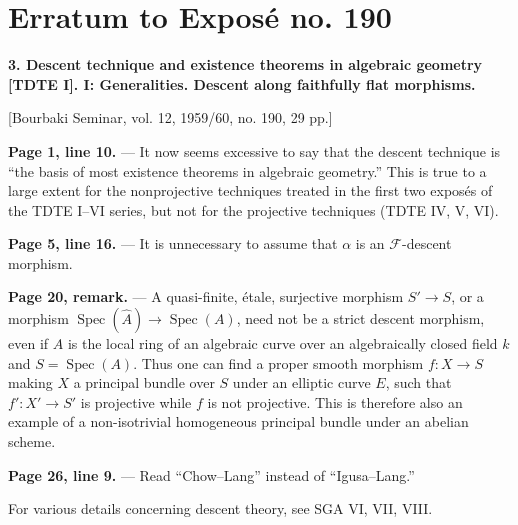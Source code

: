 \clearpage
\chapter*{Erratum to Exposé no. 190}
\setcounter{footnote}{0}

\noindent\textbf{3. Descent technique and existence theorems in algebraic
geometry [TDTE I]. I: Generalities. Descent along faithfully flat morphisms.}

\begin{center}
[Bourbaki Seminar, vol. 12, 1959/60, no. 190, 29 pp.]
\end{center}

\noindent\textbf{Page 1, line 10.} --- It now seems excessive to say that the
descent technique is “the basis of most existence theorems in algebraic
geometry.” This is true to a large extent for the nonprojective techniques
treated in the first two exposés of the TDTE I--VI series, but not for the
projective techniques (TDTE IV, V, VI).

\noindent\textbf{Page 5, line 16.} --- It is unnecessary to assume that
$\alpha$ is an $\mathcal F$-descent morphism.

\noindent\textbf{Page 20, remark.} --- A quasi-finite, étale, surjective
morphism $S'\longrightarrow S$, or a morphism
$\operatorname{Spec}(\widehat A)\longrightarrow\operatorname{Spec}(A)$, need
not be a strict descent morphism, even if $A$ is the local ring of an algebraic
curve over an algebraically closed field $k$ and $S=\operatorname{Spec}(A)$.
Thus one can find a proper smooth morphism $f:X\longrightarrow S$ making $X$ a
principal bundle over $S$ under an elliptic curve $E$, such that
$f':X'\longrightarrow S'$ is projective while $f$ is not projective. This is
therefore also an example of a non-isotrivial homogeneous principal bundle
under an abelian scheme.

\noindent\textbf{Page 26, line 9.} --- Read “Chow--Lang” instead of
“Igusa--Lang.”

For various details concerning descent theory, see SGA VI, VII, VIII.

\par\smallskip
\begingroup\footnotesize
\endgroup

